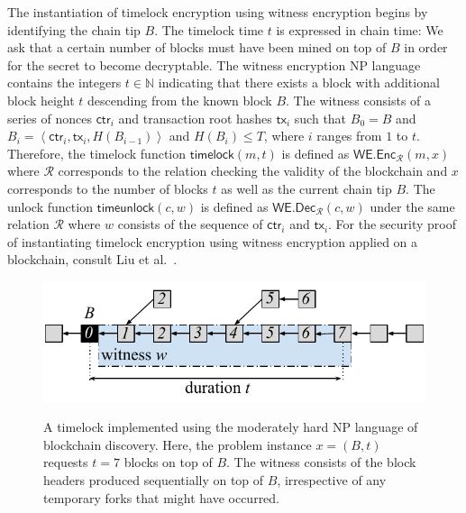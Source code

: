 The instantiation of timelock encryption using witness encryption
begins by identifying the chain tip $B$. The timelock time $t$
is expressed in chain time: We ask that a certain number of blocks must have been mined on top of $B$
in order for the secret to become decryptable. The witness encryption \textsc{NP} language contains
the integers $t \in \mathbb{N}$ indicating that there exists a block with additional block height
$t$ descending from the known block $B$. The witness consists of a series of nonces $\textsf{ctr}_i$
and transaction root hashes $\textsf{tx}_i$ such that
$B_0 = B$ and
$B_i = \left<\textsf{ctr}_i, \textsf{tx}_i, H(B_{i-1})\right>$
and $H(B_i) \leq T$,
where $i$ ranges from $1$ to $t$. Therefore, the timelock function $\textsf{timelock}(m, t)$ is defined
as $\textsf{WE.Enc}_\mathcal{R}(m, x)$ where $\mathcal{R}$ corresponds to the relation checking the
validity of the blockchain and $x$ corresponds to the number of blocks $t$ as well as the current
chain tip $B$. The unlock function $\textsf{timeunlock}(c, w)$ is defined as
$\textsf{WE.Dec}_\mathcal{R}(c, w)$ under the same relation $\mathcal{R}$ where $w$ consists of
the sequence of $\textsf{ctr}_i$ and $\textsf{tx}_i$. For the security proof of instantiating timelock
encryption using witness encryption applied on a blockchain, consult Liu et al.~\cite{timelock-bitcoin}.

\begin{figure}[ht]
    \caption{A timelock implemented using the moderately hard \textsc{NP} language of blockchain discovery.
             Here, the problem instance $x = (B, t)$ requests $t = 7$ blocks on top of $B$. The witness
             consists of the block headers produced sequentially on top of $B$, irrespective of any
             temporary forks that might have occurred.}
    \centering
    \includegraphics[width=0.8 \columnwidth,keepaspectratio]{figures/blockchain-timelock.pdf}
    \label{fig.blockchain-timelock}
\end{figure}

